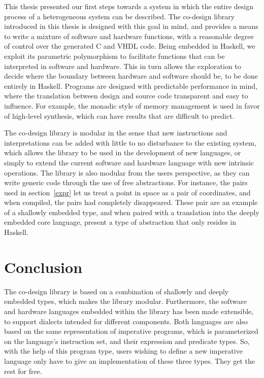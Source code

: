 \documentclass[../paper.tex]{subfiles}
\begin{document}
This thesis presented our first steps towards a system in which the entire design process of a heterogeneous system can be described. The co-design library introduced in this thesis is designed with this goal in mind, and provides a means to write a mixture of software and hardware functions, with a reasonable degree of control over the generated C and VHDL code. Being embedded in Haskell, we exploit its parametric polymorphism to facilitate functions that can be interpreted in software and hardware. This in turn allows the exploration to decide where the boundary between hardware and software should be, to be done entirely in Haskell. Programs are designed with predictable performance in mind, where the translation between design and source code transparent and easy to influence. For example, the monadic style of memory management is used in favor of high-level synthesis, which can have results that are difficult to predict.

The co-design library is modular in the sense that new instructions and interpretations can be added with little to no disturbance to the existing system, which allows the library to be used in the development of new languages, or simply to extend the current software and hardware language with new intrinsic operations. The library is also modular from the users perspective, as they can write generic code through the use of free abstractions. For instance, the pairs used in section~\ref{expr} let us treat a point in space as a pair of coordinates, and when compiled, the pairs had completely disappeared. These pair are an example of a shallowly embedded type, and when paired with a translation into the deeply embedded core language, present a type of abstraction that only resides in Haskell.

\section{Conclusion}
\label{conc}

The co-design library is based on a combination of shallowly and deeply embedded types, which makes the library modular. Furthermore, the software and hardware languages embedded within the library has been made extensible, to support dialects intended for different components. Both languages are also based on the same representation of imperative programs, which is parameterized on the language's instruction set, and their expression and predicate types. So, with the help of this program type, users wishing to define a new imperative language only have to give an implementation of these three types. They get the rest for free.
\end{document}

